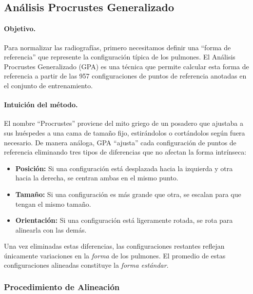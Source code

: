 \subsection{Análisis Procrustes Generalizado}
\label{subsec:gpa}

\paragraph{Objetivo.}
Para normalizar las radiografías, primero necesitamos definir una ``forma de referencia'' que represente la configuración típica de los pulmones. El Análisis Procrustes Generalizado (GPA) \cite{gower1975generalized, dryden1998statistical} es una técnica que permite calcular esta forma de referencia a partir de las 957 configuraciones de puntos de referencia anotadas en el conjunto de entrenamiento.

\paragraph{Intuición del método.}
El nombre ``Procrustes'' proviene del mito griego de un posadero que ajustaba a sus huéspedes a una cama de tamaño fijo, estirándolos o cortándolos según fuera necesario. De manera análoga, GPA ``ajusta'' cada configuración de puntos de referencia eliminando tres tipos de diferencias que no afectan la forma intrínseca:

\begin{itemize}
    \item \textbf{Posición:} Si una configuración está desplazada hacia la izquierda y otra hacia la derecha, se centran ambas en el mismo punto.
    \item \textbf{Tamaño:} Si una configuración es más grande que otra, se escalan para que tengan el mismo tamaño.
    \item \textbf{Orientación:} Si una configuración está ligeramente rotada, se rota para alinearla con las demás.
\end{itemize}

Una vez eliminadas estas diferencias, las configuraciones restantes reflejan únicamente variaciones en la \textit{forma} de los pulmones. El promedio de estas configuraciones alineadas constituye la \textit{forma estándar}.

\subsubsection{Procedimiento de Alineación}

